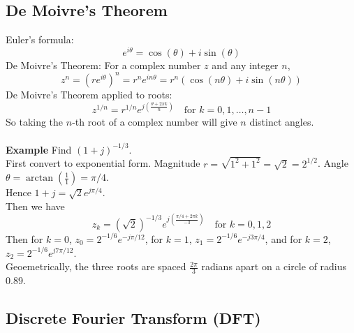 \documentclass[../linear-algebra.tex]{subfiles}
\begin{document}
\subsection{De Moivre's Theorem}
Euler's formula:
$$e^{i\theta} = \cos(\theta) + i\sin(\theta)$$
De Moivre's Theorem: For a complex number $z$ and any integer $n$,
$$z^n = (r e^{i\theta})^n = r^n e^{in\theta} = r^n(\cos(n\theta) + i\sin(n\theta))$$
De Moivre's Theorem applied to roots:\\
$$z^{1/n} = r^{1/n} e^{j(\frac{\theta + 2\pi k}{n})} \quad \text{for } k = 0, 1, \dots, n-1$$
So taking the $n$-th root of a complex number will give $n$ distinct angles.\\
\\
\textbf{Example} Find $(1+j)^{-1/3}$.\\
First convert to exponential form. Magnitude $r = \sqrt{1^2 + 1^2} = \sqrt{2} = 2^{1/2}$. Angle $\theta = \arctan(\frac{1}{1}) = \pi/4$.\\
Hence $1+j = \sqrt{2}e^{j\pi/4}$.\\ 
Then we have
$$z_k = (\sqrt{2})^{-1/3} e^{j(\frac{\pi/4 + 2\pi k}{-3})} \quad \text{for } k = 0, 1, 2$$
Then for $k=0$, $z_0 = 2^{-1/6} e^{-j\pi/12}$, for $k=1$, $z_1 = 2^{-1/6} e^{-j3\pi/4}$, and for $k=2$, $z_2 = 2^{-1/6} e^{j7\pi/12}$.\\
Geoemetrically, the three roots are spaced $\frac{2\pi}{3}$ radians apart on a circle of radius 0.89.

\subsection{Discrete Fourier Transform (DFT)}
\end{document}
